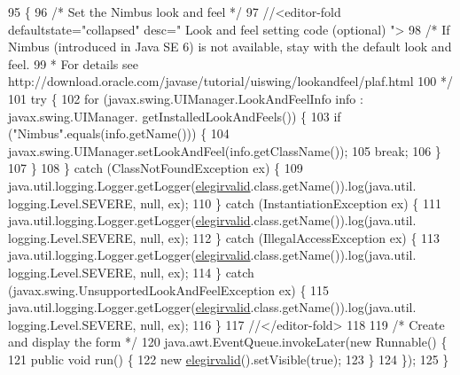 \begin{DoxyCode}
95                                            \{
96         \textcolor{comment}{/* Set the Nimbus look and feel */}
97         \textcolor{comment}{//<editor-fold defaultstate="collapsed" desc=" Look and feel setting code (optional) ">}
98         \textcolor{comment}{/* If Nimbus (introduced in Java SE 6) is not available, stay with the default look and feel.}
99 \textcolor{comment}{         * For details see http://download.oracle.com/javase/tutorial/uiswing/lookandfeel/plaf.html }
100 \textcolor{comment}{         */}
101         \textcolor{keywordflow}{try} \{
102             \textcolor{keywordflow}{for} (javax.swing.UIManager.LookAndFeelInfo info : javax.swing.UIManager.
      getInstalledLookAndFeels()) \{
103                 \textcolor{keywordflow}{if} (\textcolor{stringliteral}{"Nimbus"}.equals(info.getName())) \{
104                     javax.swing.UIManager.setLookAndFeel(info.getClassName());
105                     \textcolor{keywordflow}{break};
106                 \}
107             \}
108         \} \textcolor{keywordflow}{catch} (ClassNotFoundException ex) \{
109             java.util.logging.Logger.getLogger(\mbox{\hyperlink{classsoftware_1_1elegirvalid_a6b0b84f3a6730a79b6feb0684e6f54e6}{elegirvalid}}.class.getName()).log(java.util.
      logging.Level.SEVERE, null, ex);
110         \} \textcolor{keywordflow}{catch} (InstantiationException ex) \{
111             java.util.logging.Logger.getLogger(\mbox{\hyperlink{classsoftware_1_1elegirvalid_a6b0b84f3a6730a79b6feb0684e6f54e6}{elegirvalid}}.class.getName()).log(java.util.
      logging.Level.SEVERE, null, ex);
112         \} \textcolor{keywordflow}{catch} (IllegalAccessException ex) \{
113             java.util.logging.Logger.getLogger(\mbox{\hyperlink{classsoftware_1_1elegirvalid_a6b0b84f3a6730a79b6feb0684e6f54e6}{elegirvalid}}.class.getName()).log(java.util.
      logging.Level.SEVERE, null, ex);
114         \} \textcolor{keywordflow}{catch} (javax.swing.UnsupportedLookAndFeelException ex) \{
115             java.util.logging.Logger.getLogger(\mbox{\hyperlink{classsoftware_1_1elegirvalid_a6b0b84f3a6730a79b6feb0684e6f54e6}{elegirvalid}}.class.getName()).log(java.util.
      logging.Level.SEVERE, null, ex);
116         \}
117         \textcolor{comment}{//</editor-fold>}
118 
119         \textcolor{comment}{/* Create and display the form */}
120         java.awt.EventQueue.invokeLater(\textcolor{keyword}{new} Runnable() \{
121             \textcolor{keyword}{public} \textcolor{keywordtype}{void} run() \{
122                 \textcolor{keyword}{new} \mbox{\hyperlink{classsoftware_1_1elegirvalid_a6b0b84f3a6730a79b6feb0684e6f54e6}{elegirvalid}}().setVisible(\textcolor{keyword}{true});
123             \}
124         \});
125     \}
\end{DoxyCode}


